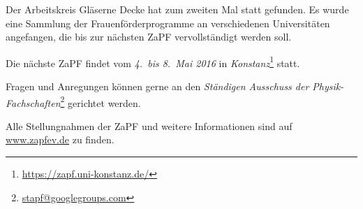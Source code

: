 Der Arbeitskreis \glqq{}Gläserne Decke\grqq{} hat zum zweiten Mal statt gefunden. Es wurde eine Sammlung der Frauenförderprogramme an verschiedenen Universitäten angefangen, die bis zur nächsten ZaPF vervollständigt werden soll.

\vfill

Die nächste ZaPF findet vom \emph{4.\ bis 8.\ Mai 2016} in \emph{Konstanz}\footnote{\href{https://zapf.uni-konstanz.de/}{\url{https://zapf.uni-konstanz.de/}}} statt.

Fragen und Anregungen können gerne an den \emph{Ständigen Ausschuss der Physik-Fachschaften}\footnote{\href{mailto:stapf@googlegroups.com}{\url{stapf@googlegroups.com}}} gerichtet werden.

Alle Stellungnahmen der ZaPF und weitere Informationen sind auf \href{http://www.zapfev.de}{\url{www.zapfev.de}} zu finden.

